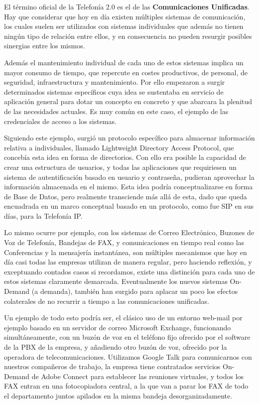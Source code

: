 El término oficial de la Telefonía 2.0 es el de las \textbf{Comunicaciones Unificadas}. Hay que considerar que hoy en día existen múltiples sistemas de comunicación, los cuales suelen ser utilizados con sistemas individuales que además no tienen ningún tipo de relación entre ellos, y en consecuencia no pueden resurgir posibles sinergias entre los mismos.

Además el mantenimiento individual de cada uno de estos sistemas implica un mayor consumo de tiempo, que repercute en costes productivos, de personal, de seguridad, infraestructura y mantenimiento. Por ello empezaron a surgir determinados sistemas específicos cuya idea se sustentaba en servicio de aplicación general para dotar un concepto en concreto y que abarcara la plenitud de las necesidades actuales. Es muy común en este caso, el ejemplo de las credenciales de acceso a los sistemas.

Siguiendo este ejemplo, surgió un protocolo específico para almacenar información relativa a individuales, llamado Lightweight Directory Access Protocol, que concebía esta idea en forma de directorios. Con ello era posible la capacidad de crear una estructura de usuarios, y todas las aplicaciones que requiriesen un sistema de autentificación basado en usuario y contraseña, pudieran aprovechar la información almacenada en el mismo. Esta idea podría conceptualizarse en forma de Base de Datos, pero realmente transciende más allá de esta, dado que queda encuadrada en un marco conceptual basado en un protocolo, como fue SIP en sus días, para la Telefonía IP.

Lo mismo ocurre por ejemplo, con los sistemas de Correo Electrónico, Buzones de Voz de Telefonía, Bandejas de FAX, y comunicaciones en tiempo real como las Conferencias y la mensajería instantánea, son múltiples mecanismos que hoy en día casi todas las empresas utilizan de manera regular, pero haciendo reflexión, y exceptuando contados casos si recordamos, existe una distinción para cada uno de estos sistemas claramente demarcada. Eventualmente los nuevos sistemas On-Demand (a demanda), también han surgido para aplacar un poco los efectos colaterales de no recurrir a tiempo a las comunicaciones unificadas. 

Un ejemplo de todo esto podría ser, el clásico uso de un entorno web-mail por ejemplo basado en un servidor de correo Microsoft Exchange, funcionando simultáneamente, con un buzón de voz en el teléfono fijo ofrecido por el software de la PBX de la empresa, y añadiendo otro buzón de voz, ofrecido por la operadora de telecomunicaciones. Utilizamos Google Talk para comunicarnos con nuestros compañeros de trabajo, la empresa tiene contratados servicios On-Demand de Adobe Connect para establecer las reuniones virtuales, y todos los FAX entran en una fotocopiadora central, a la que van a parar los FAX de todo el departamento juntos apilados en la misma bandeja desorganizadamente.

